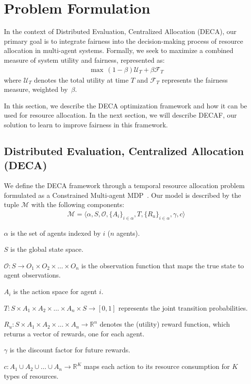 



\section{Problem Formulation}
\label{sec:problem_formulation}
In the context of Distributed Evaluation, Centralized Allocation (DECA), our primary goal is to integrate fairness into the decision-making process of resource allocation in multi-agent systems. Formally, we seek to maximize a combined measure of system utility and fairness, represented as:
\begin{align}
    \max \, (1-\beta) \mathcal{U}_T + \beta \mathcal{F}_T \label{eq:objective}
\end{align}
where $\mathcal{U}_T$ denotes the total utility at time $T$ and $\mathcal{F}_T$ represents the fairness measure, weighted by~$\beta$. 

In this section, we describe the DECA optimization framework and how it can be used for resource allocation. In the next section, we will describe DECAF, our solution to learn to improve fairness in this framework.

\subsection{Distributed Evaluation, Centralized Allocation (DECA)}

We define the DECA framework through a temporal resource allocation problem formulated as a Constrained Multi-agent MDP~\citep{CMMDP_de2021}. Our model is described by the tuple $\mathcal{M}$ with the following components:
\begin{align}
\mathcal{M} = \langle \alpha, S, \mathcal{O}, \{A_i\}_{i \in \alpha}, T, \{R_u\}_{i \in \alpha}, \gamma, c \rangle %
\end{align}
\squishlist
    \item $\alpha$ is the set of agents indexed by $i$ ($n$ agents).
    \item $S$ is the global state space.
    \item $\mathcal{O}: S \rightarrow O_1 \times O_2 \times \ldots \times O_n$ is the observation function that maps the true state to agent observations.
    \item $A_i$ is the action space for agent $i$.
    \item $T: S \times A_1 \times A_2 \times \ldots \times A_n \times S \rightarrow [0,1]$ represents the joint transition probabilities.
    \item $R_u: S \times A_1 \times A_2 \times \ldots \times A_n  \rightarrow \mathbb{R}^n$ denotes the (utility) reward function, which returns a vector of rewards, one for each agent.%
    \item $\gamma$ is the discount factor for future rewards.
    \item $c: A_1 \cup A_2 \cup \ldots \cup A_n \rightarrow \mathbb{R}^K$ maps each action to its resource consumption for $K$ types of resources.
\squishend



